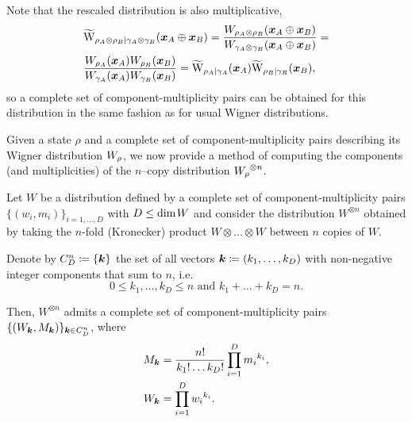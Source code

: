 Note that the rescaled distribution is also multiplicative,
\begin{align}
	&\widetilde{\rm{W}}_{\rho_A \otimes \rho_B | \gamma_A \otimes \gamma_B}(\bmx_A \oplus \bmx_B) = \frac{\W[\bmx_A \oplus \bmx_B]{\rho_A \otimes \rho_B}}{\W[\bmx_A \oplus \bmx_B]{\gamma_A \otimes \gamma_B}} = \nonumber \\
	&\frac{\W[\bmx_A]{\rho_A}\W[\bmx_B]{\rho_B}}{\W[\bmx_A]{\gamma_A}\W[\bmx_B]{\gamma_B}} = \widetilde{\rm{W}}_{\rho_A | \gamma_A}(\bmx_A)\widetilde{\rm{W}}_{\rho_B  | \gamma_B}(\bmx_B),
\end{align}
so a complete set of component-multiplicity pairs can be obtained for this distribution in the same fashion as for usual Wigner distributions.

Given a state $\rho$ and a complete set of component-multiplicity pairs describing its Wigner distribution $\W{\rho}$, we now provide a method of computing the components (and multiplicities) of the $n$--copy distribution $\W{\rho}^{\otimes n}$.
\begin{lemma}\label{lem:ncopycomponents}
	Let $W$ be a distribution defined by a complete set of component-multiplicity pairs $\{(w_i, m_i)\}_{i=1,\dots,D}$ with $D \leq {\rm{dim}}\hspace{1pt}W$ and consider the distribution $W^{\otimes n}$ obtained by taking the $n$-fold (Kronecker) product $W \otimes \dots \otimes W$ between $n$ copies of $W$.
	
	Denote by $C_D^n \coloneqq \{\bm{k}\}$ the set of all vectors $\bm{k} \coloneqq (k_1, \dots, k_D)$ with non-negative integer components that sum to $n$, i.e.
	\begin{equation*}
	0 \leq k_1, \dots, k_D \leq n \text{ and } k_1 + \dots + k_D = n.
	\end{equation*}
	
	Then, $W^{\otimes n}$ admits a complete set of component-multiplicity pairs $\{(W_{\bm{k}}, M_{\bm{k}})\}_{\bm{k} \in C_D^n}$, where
\begin{align}
	M_{\bm{k}} &= \frac{n!}{k_1!\dots k_D!} \prod\limits_{i=1}^D {m_i}^{k_i}, \label{eq:M}\\
	W_{\bm{k}} &= \prod\limits_{i=1}^D {w_i}^{k_i}. \label{eq:W}
\end{align}
\end{lemma}
